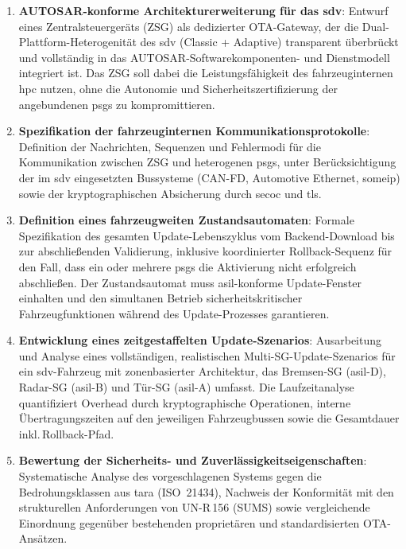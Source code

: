 ﻿\documentclass[12pt,a4paper,twoside]{article}
\begin{document}
\begin{enumerate}[leftmargin=*]
  \item \textbf{AUTOSAR-konforme Architekturerweiterung für das \gls{sdv}}:
    Entwurf eines Zentralsteuergeräts (ZSG) als dedizierter OTA-Gateway,
    der die Dual-Plattform-Heterogenität des \gls{sdv} (Classic + Adaptive)
    transparent überbrückt und vollständig in das AUTOSAR-Softwarekomponenten-
    und Dienstmodell integriert ist. Das ZSG soll dabei die
    Leistungsfähigkeit des fahrzeuginternen \gls{hpc} nutzen, ohne
    die Autonomie und Sicherheitszertifizierung der angebundenen
    \glspl{psg} zu kompromittieren.

  \item \textbf{Spezifikation der fahrzeuginternen Kommunikationsprotokolle}:
    Definition der Nachrichten, Sequenzen und Fehlermodi für die
    Kommunikation zwischen ZSG und heterogenen \glspl{psg}, unter
    Berücksichtigung der im \gls{sdv} eingesetzten Bussysteme
    (CAN-FD, Automotive Ethernet, \gls{someip}) sowie der
    kryptographischen Absicherung durch \gls{secoc} und \gls{tls}.

  \item \textbf{Definition eines fahrzeugweiten Zustandsautomaten}:
    Formale Spezifikation des gesamten Update-Lebenszyklus vom
    Backend-Download bis zur abschließenden Validierung, inklusive
    koordinierter Rollback-Sequenz für den Fall, dass ein oder
    mehrere \glspl{psg} die Aktivierung nicht erfolgreich abschließen.
    Der Zustandsautomat muss \gls{asil}-konforme Update-Fenster
    einhalten und den simultanen Betrieb sicherheitskritischer
    Fahrzeugfunktionen während des Update-Prozesses garantieren.

  \item \textbf{Entwicklung eines zeitgestaffelten Update-Szenarios}:
    Ausarbeitung und Analyse eines vollständigen, realistischen
    Multi-SG-Update-Szenarios für ein \gls{sdv}-Fahrzeug mit
    zonenbasierter Architektur, das Bremsen-SG (\gls{asil}-D),
    Radar-SG (\gls{asil}-B) und Tür-SG (\gls{asil}-A) umfasst.
    Die Laufzeitanalyse quantifiziert Overhead durch kryptographische
    Operationen, interne Übertragungszeiten auf den jeweiligen
    Fahrzeugbussen sowie die Gesamtdauer inkl.\,Rollback-Pfad.

  \item \textbf{Bewertung der Sicherheits- und Zuverlässigkeitseigenschaften}:
    Systematische Analyse des vorgeschlagenen Systems gegen die
    Bedrohungsklassen aus \gls{tara} (ISO~21434), Nachweis der
    Konformität mit den strukturellen Anforderungen von
    UN-R\,156 (SUMS) sowie vergleichende Einordnung gegenüber
    bestehenden proprietären und standardisierten OTA-Ansätzen.
\end{enumerate}
\end{document}
